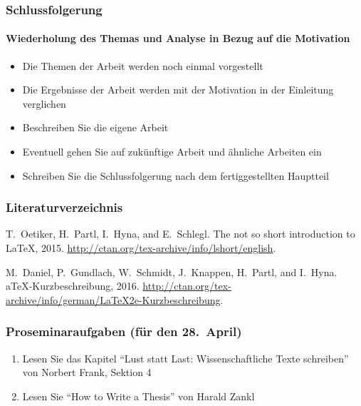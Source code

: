 \begin{frame}
\frametitle{Schlussfolgerung}
\framesubtitle{Wiederholung des Themas und Analyse in Bezug auf die Motivation}

\begin{itemize}
\item<2-> Die Themen der Arbeit werden noch einmal vorgestellt
\item<3-> Die Ergebnisse der Arbeit werden mit der Motivation in der Einleitung
  verglichen
\item<4-> Beschreiben Sie die eigene Arbeit
\item<5-> Eventuell gehen Sie auf zukünftige Arbeit und ähnliche Arbeiten ein
\item<6-> Schreiben Sie die Schlussfolgerung nach dem fertiggestellten Hauptteil
\end{itemize}

\bigskip
\begin{Beispiel}
\end{Beispiel}
\end{frame}

\begin{frame}
\frametitle{Literaturverzeichnis}
\small
% 
% 
\begin{thebibliography}{1}

T.~Oetiker, H.~Partl, I.~Hyna, and E.~Schlegl.
\newblock The not so short introduction to {L}a{T}e{X}, 2015.
\newblock \url{http://ctan.org/tex-archive/info/lshort/english}.

M.~Daniel, P.~Gundlach, W.~Schmidt, J.~Knappen, H.~Partl, and I.~Hyna.
a{T}e{X}-{K}urzbeschreibung, 2016.
\newblock \url{http://ctan.org/tex-archive/info/german/LaTeX2e-Kurzbeschreibung}.

\end{thebibliography}

\end{frame}

\begin{frame}
\frametitle{Proseminaraufgaben (für den 28.~April)}    

\begin{enumerate}
\item<2-> Lesen Sie das Kapitel \enquote{Lust statt Last: Wissenschaftliche Texte schreiben}
von Norbert Frank, Sektion 4
\item<3-> Lesen Sie \enquote{How to Write a Thesis} von Harald Zankl
\end{enumerate}
\end{frame}


